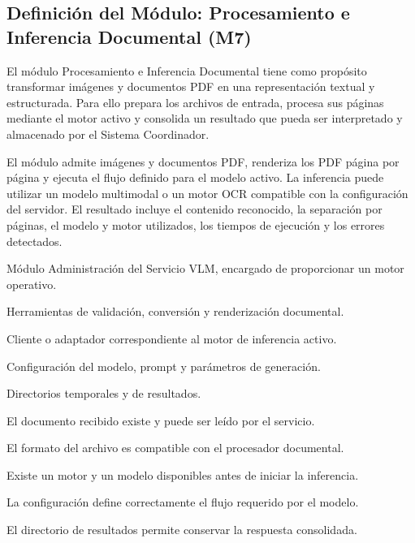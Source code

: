 
\subsection{Definición del Módulo: Procesamiento e Inferencia Documental (M7)}
\label{subsec:modulo_m7}

\begin{definicionmodulo}

\item[Propósito] El módulo Procesamiento e Inferencia Documental tiene como propósito transformar imágenes y documentos PDF en una representación textual y estructurada. Para ello prepara los archivos de entrada, procesa sus páginas mediante el motor activo y consolida un resultado que pueda ser interpretado y almacenado por el Sistema Coordinador.

\item[Alcance] El módulo admite imágenes y documentos PDF, renderiza los PDF página por página y ejecuta el flujo definido para el modelo activo. La inferencia puede utilizar un modelo multimodal o un motor OCR compatible con la configuración del servidor. El resultado incluye el contenido reconocido, la separación por páginas, el modelo y motor utilizados, los tiempos de ejecución y los errores detectados.

\item[Dependencias]
\begin{elementosmodulo}
    \item Módulo Administración del Servicio VLM, encargado de proporcionar un motor operativo.
    \item Herramientas de validación, conversión y renderización documental.
    \item Cliente o adaptador correspondiente al motor de inferencia activo.
    \item Configuración del modelo, prompt y parámetros de generación.
    \item Directorios temporales y de resultados.
\end{elementosmodulo}

\item[Supuestos]
\begin{elementosmodulo}
    \item El documento recibido existe y puede ser leído por el servicio.
    \item El formato del archivo es compatible con el procesador documental.
    \item Existe un motor y un modelo disponibles antes de iniciar la inferencia.
    \item La configuración define correctamente el flujo requerido por el modelo.
    \item El directorio de resultados permite conservar la respuesta consolidada.
\end{elementosmodulo}


\end{definicionmodulo}

